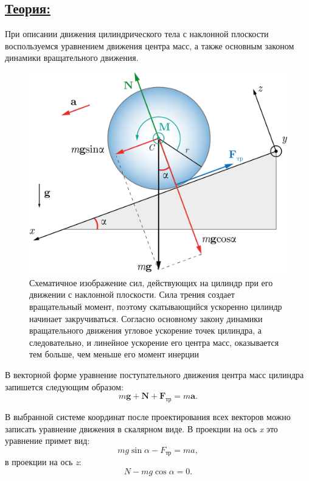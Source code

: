 \documentclass[14pt,a4paper,oneside]{extarticle}	%
\begin{document}
	\newpage	
	\subsection*{\underline{Теория:}}
	
	При описании движения цилиндрического тела с наклонной плоскости воспользуемся уравнением движения центра масс, а также основным законом динамики вращательного движения.
	
	\begin{figure}[H] 	
		\centering 	
		\includegraphics[width=0.75\linewidth]{inclinedplane-3.png}
		\caption{Схематичное изображение сил, действующих на цилиндр при его движении с наклонной плоскости. Сила трения создает вращательный момент, поэтому скатывающийся ускоренно цилиндр начинает закручиваться. Согласно основному закону динамики вращательного движения угловое ускорение точек цилиндра, а следовательно, и линейное ускорение его центра масс, оказывается тем больше, чем меньше его момент инерции}
		\label{inclinedplane-3}
	\end{figure}

	В векторной форме уравнение поступательного движения центра масс цилиндра запишется следующим образом:
	\begin{equation}\label{inclinedplane-1eq1}
	m\textbf{g}+\textbf{N}+\textbf{F}_{\text{тр}} = m\textbf{a}.
	\end{equation} 
	
В выбранной системе координат после проектирования всех векторов можно записать уравнение движения в скалярном виде.
В проекции на ось  \textit{x}  это уравнение примет вид:
	\begin{equation}\label{inclinedplane-1eq2}
	mg\sin\alpha - F_{\text{тр}} = ma,
	\end{equation}
	в проекции на ось  \textit{z}:
	\begin{equation}\label{inclinedplane-1eq3}
	N - mg\cos\alpha = 0.
	\end{equation}
	
\end{document}
